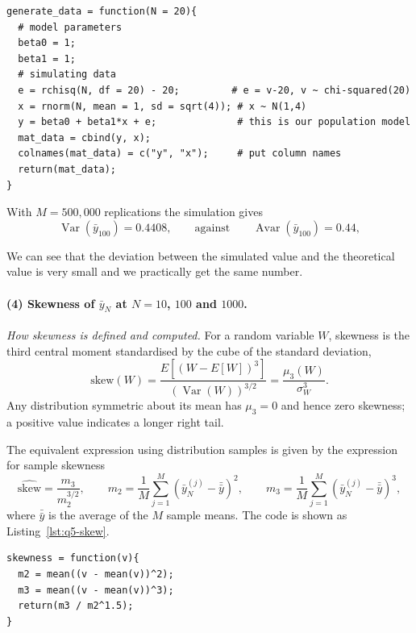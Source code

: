 \documentclass[11pt]{article}
\newcommand{\code}[1]{\texttt{#1}}
\DeclareMathOperator{\Var}{Var}
\DeclareMathOperator{\Avar}{Avar}
\begin{document}
\begin{lstlisting}[style=Rcode,caption={The data generating process (excerpt
from \code{R/q5\_simulation\_asymptotics.R}).},label={lst:q5-dgp}]
generate_data = function(N = 20){
  # model parameters
  beta0 = 1;
  beta1 = 1;
  # simulating data
  e = rchisq(N, df = 20) - 20;         # e = v-20, v ~ chi-squared(20)
  x = rnorm(N, mean = 1, sd = sqrt(4)); # x ~ N(1,4)
  y = beta0 + beta1*x + e;              # this is our population model
  mat_data = cbind(y, x);
  colnames(mat_data) = c("y", "x");     # put column names
  return(mat_data);
}
\end{lstlisting}

With $M = 500{,}000$ replications the simulation gives
\[
\Var(\bar{y}_{100}) = 0.4408,
\qquad\text{against}\qquad
\Avar(\bar{y}_{100}) = 0.44,
\]

We can see that the deviation between the simulated value and the theoretical value is very small and we practically get the same number.

\paragraph{(4) Skewness of $\bar{y}_N$ at $N = 10$, $100$ and $1000$.}

\emph{How skewness is defined and computed.} For a random variable $W$,
skewness is the third central moment standardised by the cube of the standard
deviation,
\[
\text{skew}(W)
= \frac{E\!\left[(W - E[W])^3\right]}{\left(\Var(W)\right)^{3/2}}
= \frac{\mu_3(W)}{\sigma_W^3}.
\]
Any distribution symmetric about its
mean has $\mu_3 = 0$ and hence zero skewness; a positive value indicates a
longer right tail.

The equivalent expression using distribution samples is given by the expression for sample skewness
\[
\widehat{\text{skew}} = \frac{m_3}{m_2^{3/2}},
\qquad
m_2 = \frac{1}{M}\sum_{j=1}^{M}\left(\bar{y}_N^{(j)} - \bar{\bar{y}}\right)^2,
\qquad
m_3 = \frac{1}{M}\sum_{j=1}^{M}\left(\bar{y}_N^{(j)} - \bar{\bar{y}}\right)^3,
\]
where $\bar{\bar{y}}$ is the average of the $M$ sample means. The code is shown as Listing~\ref{lst:q5-skew}.

\begin{lstlisting}[style=Rcode,caption={The sample skewness (excerpt from
\code{R/q5\_simulation\_asymptotics.R}).},label={lst:q5-skew}]
skewness = function(v){
  m2 = mean((v - mean(v))^2);
  m3 = mean((v - mean(v))^3);
  return(m3 / m2^1.5);
}
\end{lstlisting}
\end{document}
